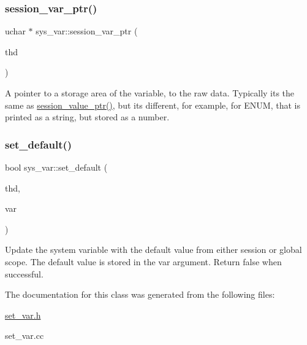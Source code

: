 \subsubsection{\texorpdfstring{session\+\_\+var\+\_\+ptr()}{session\_var\_ptr()}}
{\footnotesize\ttfamily uchar $\ast$ sys\+\_\+var\+::session\+\_\+var\+\_\+ptr (\begin{DoxyParamCaption}\item[{T\+HD $\ast$}]{thd }\end{DoxyParamCaption})\hspace{0.3cm}{\ttfamily [protected]}}

A pointer to a storage area of the variable, to the raw data. Typically it\textquotesingle{}s the same as \mbox{\hyperlink{classsys__var_a3e511591aaf555d2bc2ce40a80b7e899}{session\+\_\+value\+\_\+ptr()}}, but it\textquotesingle{}s different, for example, for E\+N\+UM, that is printed as a string, but stored as a number. \mbox{\label{classsys__var_aa6156d101adc98441ce701a2da290987}} 
\subsubsection{\texorpdfstring{set\+\_\+default()}{set\_default()}}
{\footnotesize\ttfamily bool sys\+\_\+var\+::set\+\_\+default (\begin{DoxyParamCaption}\item[{T\+HD $\ast$}]{thd,  }\item[{\mbox{\hyperlink{classset__var}{set\+\_\+var}} $\ast$}]{var }\end{DoxyParamCaption})}

Update the system variable with the default value from either session or global scope. The default value is stored in the \textquotesingle{}var\textquotesingle{} argument. Return false when successful. 

The documentation for this class was generated from the following files\+:\begin{DoxyCompactItemize}
\item 
\mbox{\hyperlink{set__var_8h}{set\+\_\+var.\+h}}\item 
set\+\_\+var.\+cc\end{DoxyCompactItemize}

